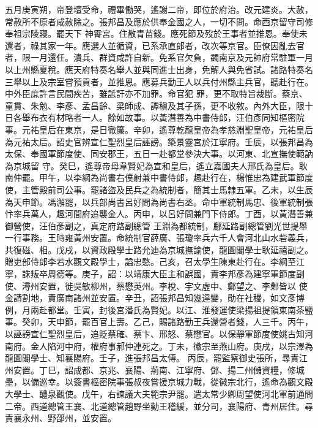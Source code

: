 \begin{pinyinscope}
 五月庚寅朔，帝登壇受命，禮畢慟哭，遙謝二帝，即位於府治。改元建炎。大赦，常赦所不原者咸赦除之。張邦昌及應於供奉金國之人，一切不問。命西京留守司修奉祖宗陵寢。罷天下
 神霄宮。住散青苗錢。應死節及歿於王事者並推恩。奉使未還者，祿其家一年。應選人並循資，已系承直郎者，改次等京官。臣僚因亂去官者，限一月還任。潰兵、群資咸許自新。免系官欠負，蠲南京及元帥府常駐軍一月以上州縣夏稅。應天府特奏名舉人並與同進士出身，免解人與免省試。諸路特奏名三舉以上及宗室嘗預貢者，並推恩。應募兵勤王人以兵付州縣主兵官，聽赴行在。中外臣庶許言民間疾苦，雖詆訐亦不加罪。命官犯
 罪，更不取特旨裁斷。蔡京、童貫、朱勉、李彥、孟昌齡、梁師成、譚稹及其子孫，更不收敘。內外大臣，限十日各舉布衣有材略者一人。餘如故事。以黃潛善為中書侍郎，汪伯彥同知樞密院事。元祐皇后在東京，是日徹簾。辛卯，遙尊乾龍皇帝為孝慈淵聖皇帝，元祐皇后為元祐太后。詔史官辨宣仁聖烈皇后誣謗。築景靈宮於江寧府。壬辰，以張邦昌為太保、奉國軍節度使、同安郡王，五日一赴都堂參決大事。以河東、北宣撫使範訥為京城留
 守。癸巳，遙尊帝母韋賢妃為宣和皇后，遙立嘉國夫人邢氏為皇后。耿南仲罷。甲午，以李綱為尚書右僕射兼中書侍郎，趣赴行在，楊惟忠為建武軍節度使，主管殿前司公事。罷諸盜及民兵之為統制者，簡其士馬隸五軍。乙未，以生辰為天申節。馮澥罷，以兵部尚書呂好問為尚書右丞。命中軍統制馬忠、後軍統制張忭率兵萬人，趣河間府追襲金人。丙申，以呂好問兼門下侍郎。丁酉，以黃潛善兼御營使，汪伯彥副之，真定府路副總管
 王淵為都統制，鄜延路副總管劉光世提舉一行事務。王時雍黃州安置。命統制官薛廣、張瓊率兵六千人會河北山水砦義兵，共復磁、相。戊戌，以資政殿學士路允迪為京城撫諭使，龍圖閣學士耿延禧副之。贈吏部侍郎李若水觀文殿學士，謚忠愍。己亥，召太學生陳東赴行在。李綱至江寧，誅叛卒周德等。庚子，詔：以靖康大臣主和誤國，責李邦彥為建寧軍節度副使、潯州安置，徙吳敏柳州，蔡懋英州。李梲、宇文虛中、鄭望之、李鄴皆以
 使金請割地，責廣南諸州並安置。辛丑，詔張邦昌知幾達變，勛在社稷，如文彥博例，月兩赴都堂。壬寅，封後宮潘氏為賢妃。以江、淮發運使梁揚祖提領東南茶鹽事。癸卯，天申節，罷百官上壽。乙己，賜諸路勤王兵還營者錢，人三千。丙午，以誣謗宣仁聖烈皇后，追貶蔡確、蔡卞、邢怒、蔡懋官。以保靜軍節度使姚古知河南府。金人陷河中府，權府事郝仲連死之。丁未，徽宗至燕山府。庚戌，以宗澤為龍圖閣學士、知襄陽府。壬子，進張邦昌太傅。
 丙辰，罷監察御史張所，尋責江州安置。丁巳，詔成都、京兆、襄陽、荊南、江寧府、鄧、揚二州儲資糧，修城壘，以備巡幸。以簽書樞密院事張叔夜嘗援京城力戰，從徽宗北行，遙命為觀文殿大學士、醴泉觀使。戊午，右諫議大夫範宗尹罷。遣太常少卿周望使河北軍前通問二帝。西道總管王襄、北道總管趙野坐勤王稽緩，並分司，襄陽府、青州居住。尋責襄永州、野邵州，並安置。




\end{pinyinscope}
